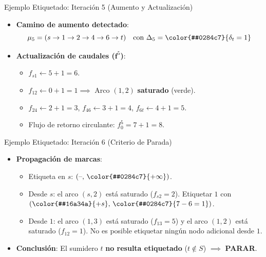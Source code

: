\documentclass[
  ignorenonframetext,
]{beamer}
\providecommand{\tightlist}{%
  \setlength{\itemsep}{0pt}\setlength{\parskip}{0pt}}
\begin{document}
\begin{frame}{Ejemplo Etiquetado: Iteración 5 (Aumento y Actualización)}
\label{ejemplo-etiquetado-iteraciuxf3n-5-aumento-y-actualizaciuxf3n}
\begin{itemize}
\item
  \textbf{Camino de aumento detectado}:
  \[\mu_5 = (s \to 1 \to 2 \to 4 \to 6 \to t) \quad \text{con } \Delta_5 = \color{#0284c7}{\delta_t = 1}\]
\item
  \textbf{Actualización de caudales (\(\mathbf{f}^5\))}:

  \begin{itemize}
  \tightlist
  \item
    \(f_{s1} \leftarrow 5 + 1 = 6\).
  \item
    \(f_{12} \leftarrow 0 + 1 = 1 \implies\) Arco \((1,2)\)
    \textbf{saturado} (verde).
  \item
    \(f_{24} \leftarrow 2 + 1 = 3\), \(f_{46} \leftarrow 3 + 1 = 4\),
    \(f_{6t} \leftarrow 4 + 1 = 5\).
  \item
    Flujo de retorno circulante: \(f_0^5 = 7 + 1 = 8\).
  \end{itemize}
\end{itemize}
\end{frame}

\begin{frame}{Ejemplo Etiquetado: Iteración 6 (Criterio de Parada)}
\label{ejemplo-etiquetado-iteraciuxf3n-6-criterio-de-parada}
\begin{itemize}
\tightlist
\item
  \textbf{Propagación de marcas}:

  \begin{itemize}
  \tightlist
  \item
    Etiqueta en \(s\): \((\text{–}, \, \color{#0284c7}{+\infty})\).
  \item
    Desde \(s\): el arco \((s,2)\) está saturado (\(f_{s2} = 2\)).
    Etiquetar \(1\) con
    \((\color{#16a34a}{+s}, \, \color{#0284c7}{7 - 6 = 1})\).
  \item
    Desde \(1\): el arco \((1,3)\) está saturado (\(f_{13} = 5\)) y el
    arco \((1,2)\) está saturado (\(f_{12} = 1\)). No es posible
    etiquetar ningún nodo adicional desde \(1\).
  \end{itemize}
\item
  \textbf{Conclusión}: El sumidero \(t\) \textbf{no resulta etiquetado}
  (\(t \notin S\)) \(\implies\) \textbf{PARAR}.
\end{itemize}
\end{frame}
\end{document}
